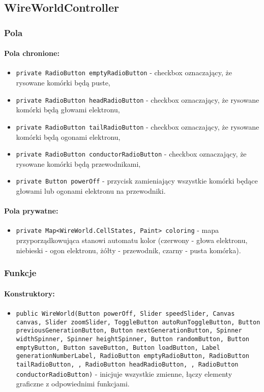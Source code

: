 \documentclass{report}
\begin{document}
\subsection{WireWorldController}
\subsubsection{Pola}
\paragraph{Pola chronione:}
\begin{itemize}	\label{sec:checkbox}
	\item \texttt{private RadioButton emptyRadioButton} - checkbox oznaczający, że rysowane komórki będą puste,
	\item \texttt{private RadioButton headRadioButton} - checkbox oznaczający, że rysowane komórki będą głowami elektronu,
	\item \texttt{private RadioButton tailRadioButton} - checkbox oznaczający, że rysowane komórki będą ogonami elektronu,
	\item \texttt{private RadioButton conductorRadioButton} - checkbox oznaczający, że rysowane komórki będą przewodnikami,
	\item \texttt{private Button powerOff} - przycisk zamieniający wszystkie komórki będące głowami lub ogonami elektronu na przewodniki.
\end{itemize}

\paragraph{Pola prywatne:}
\begin{itemize}
	\item \texttt{private Map<WireWorld.CellStates, Paint> coloring} - mapa przyporządkowująca stanowi automatu kolor (czerwony - głowa elektronu, niebieski - ogon elektronu, żółty - przewodnik, czarny - pusta komórka).
\end{itemize}
\subsubsection{Funkcje}
\paragraph{Konstruktory:}
\begin{itemize}
\item \texttt{public WireWorld(Button powerOff, Slider speedSlider, Canvas canvas, Slider zoomSlider, ToggleButton autoRunToggleButton, Button previousGenerationButton, Button nextGenerationButton, Spinner widthSpinner, Spinner heightSpinner, Button randomButton, Button emptyButton, Button saveButton, Button loadButton, Label generationNumberLabel, RadioButton emptyRadioButton, RadioButton tailRadioButton, , RadioButton headRadioButton, , RadioButton conductorRadioButton)} - inicjuje wszystkie zmienne, łączy elementy graficzne z odpowiednimi funkcjami.
\end{itemize}
\end{document}
